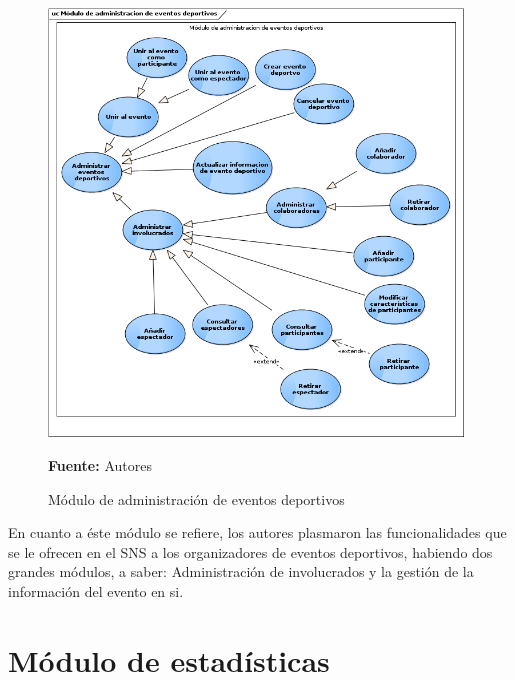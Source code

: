 \begin{figure}[!htb]
  \begin{center}
    \includegraphics[width=11cm]{./imagenes/casos_uso/gestion_evento.png}
    \caption{Módulo de administración de eventos deportivos}
    \label{fig:cu_admin_eve}
    \textbf{Fuente:} Autores
  \end{center}
\end{figure}

En cuanto a éste módulo se refiere, los autores plasmaron las funcionalidades que se le ofrecen en el SNS a los organizadores de eventos deportivos, habiendo dos grandes módulos, a saber: Administración de involucrados y la gestión de la información del evento en si.

\section{Módulo de estadísticas}

